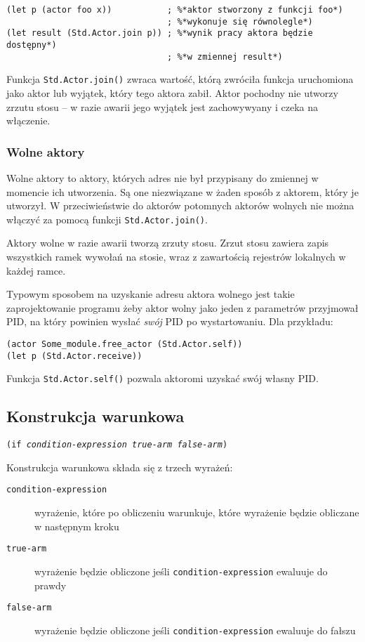 \begin{lstlisting}
(let p (actor foo x))           ; %*aktor stworzony z funkcji foo*)
                                ; %*wykonuje się równolegle*)
(let result (Std.Actor.join p)) ; %*wynik pracy aktora będzie dostępny*)
                                ; %*w zmiennej result*)
\end{lstlisting}

Funkcja \texttt{Std.Actor.join()} zwraca wartość, którą zwróciła funkcja
uruchomiona jako aktor lub wyjątek, który tego aktora zabił. Aktor pochodny nie
utworzy zrzutu stosu -- w razie awarii jego wyjątek jest zachowywyany i czeka na
włączenie.

\subsubsection{Wolne aktory}

Wolne aktory to aktory, których adres nie był przypisany do zmiennej w momencie ich utworzenia. Są one
niezwiązane w żaden sposób z aktorem, który je utworzył. W przeciwieństwie do aktorów potomnych aktorów
wolnych nie można włączyć za pomocą funkcji \texttt{Std.Actor.join()}.

Aktory wolne w razie awarii tworzą zrzuty stosu. Zrzut stosu zawiera zapis
wszystkich ramek wywołań na stosie, wraz z zawartością rejestrów lokalnych w
każdej ramce.

Typowym sposobem na uzyskanie adresu aktora wolnego jest takie zaprojektowanie programu żeby aktor wolny jako
jeden z parametrów przyjmował PID, na który powinien wysłać \emph{swój} PID po wystartowaniu. Dla przykładu:

\begin{lstlisting}
(actor Some_module.free_actor (Std.Actor.self))
(let p (Std.Actor.receive))
\end{lstlisting}

Funkcja \texttt{Std.Actor.self()} pozwala aktoromi uzyskać swój własny PID.

\subsection{Konstrukcja warunkowa}

\texttt{(if \emph{condition-expression} \emph{true-arm} \emph{false-arm})}
\newline

Konstrukcja warunkowa składa się z trzech wyrażeń:

\begin{description}
    \item[\texttt{condition-expression}] wyrażenie, które po obliczeniu warunkuje, które wyrażenie będzie
        obliczane w następnym kroku
    \item[\texttt{true-arm}] wyrażenie będzie obliczone jeśli \texttt{condition-expression} ewaluuje do prawdy
    \item[\texttt{false-arm}] wyrażenie będzie obliczone jeśli \texttt{condition-expression} ewaluuje do
        fałszu
\end{description}

